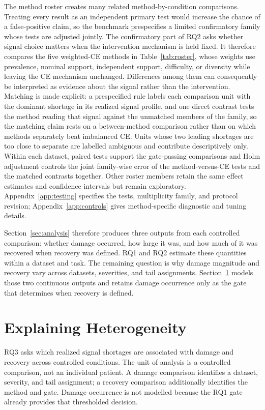\documentclass[11pt]{article}
\begin{document}
The method roster creates many related method-by-condition comparisons. Treating every result as an independent primary test would increase the chance of a false-positive claim, so the benchmark prespecifies a limited confirmatory family whose tests are adjusted jointly. The confirmatory part of RQ2 asks whether signal choice matters when the intervention mechanism is held fixed. It therefore compares the five weighted-CE methods in Table~\ref{tab:roster}, whose weights use prevalence, nominal support, independent support, difficulty, or diversity while leaving the CE mechanism unchanged. Differences among them can consequently be interpreted as evidence about the signal rather than the intervention. Matching is made explicit: a prespecified rule labels each comparison unit with the dominant shortage in its realized signal profile, and one direct contrast tests the method reading that signal against the unmatched members of the family, so the matching claim rests on a between-method comparison rather than on which methods separately beat imbalanced CE. Units whose two leading shortages are too close to separate are labelled ambiguous and contribute descriptively only. Within each dataset, paired tests support the gate-passing comparisons and Holm adjustment controls the joint family-wise error of the method-versus-CE tests and the matched contrasts together. Other roster members retain the same effect estimates and confidence intervals but remain exploratory. Appendix~\ref{app:testing} specifies the tests, multiplicity family, and protocol revision; Appendix~\ref{app:controls} gives method-specific diagnostic and tuning details.

Section~\ref{sec:analysis} therefore produces three outputs from each controlled comparison: whether damage occurred, how large it was, and how much of it was recovered when recovery was defined. RQ1 and RQ2 estimate these quantities within a dataset and task. The remaining question is why damage magnitude and recovery vary across datasets, severities, and tail assignments. Section~\ref{sec:rq3} models those two continuous outputs and retains damage occurrence only as the gate that determines when recovery is defined.

\section{Explaining Heterogeneity}
\label{sec:rq3}
RQ3 asks which realized signal shortages are associated with damage and recovery across controlled conditions. The unit of analysis is a controlled comparison, not an individual patient. A damage comparison identifies a dataset, severity, and tail assignment; a recovery comparison additionally identifies the method and gate. Damage occurrence is not modelled because the RQ1 gate already provides that thresholded decision.
\end{document}
